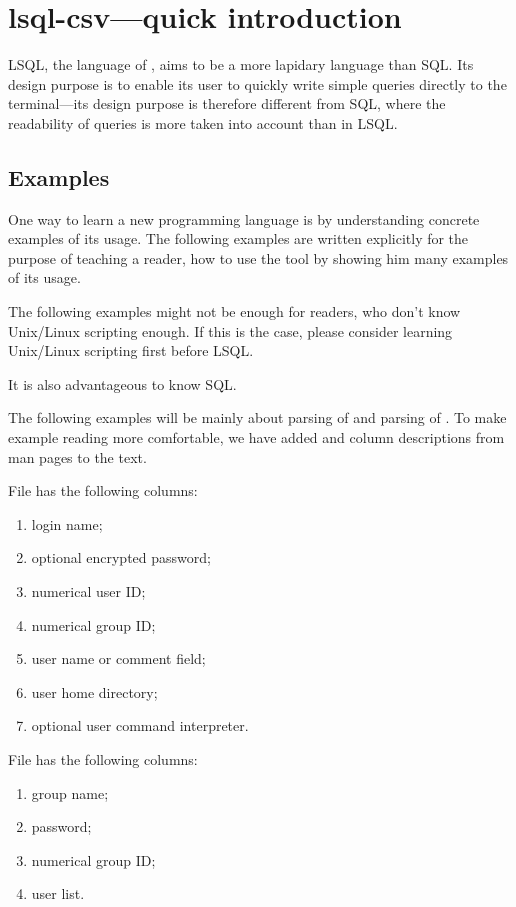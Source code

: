 \section{lsql-csv---quick introduction}
LSQL, the language of , aims to be a more lapidary language than SQL. Its design purpose is to enable its user to quickly write simple queries directly to the terminal---its design purpose is therefore different from SQL, where the readability of queries is more taken into account than in LSQL.

\subsection{Examples}
One way to learn a new programming language is by understanding concrete examples of its usage. The following examples are written explicitly for the purpose of teaching a reader, how to use the tool  by showing him many examples of its usage.

The following examples might not be enough for readers, who don't know Unix/Linux scripting enough. If this is the case, please consider learning Unix/\allowbreak Linux scripting first before LSQL.

It is also advantageous to know SQL.

The following examples will be mainly about parsing of  and parsing of . To make example reading more comfortable, we have added  and  column descriptions from man pages to the text.

File  has the following columns\cite{passwd}:
\begin{enumerate}
    \item login name;
    \item optional encrypted password;
    \item numerical user ID;
    \item numerical group ID;    
    \item user name or comment field;
    \item user home directory;
    \item optional user command interpreter.
\end{enumerate}
File  has the following columns\cite{group}:
\begin{enumerate}
    \item group name;
    \item password;
    \item numerical group ID;
    \item user list.
\end{enumerate}


